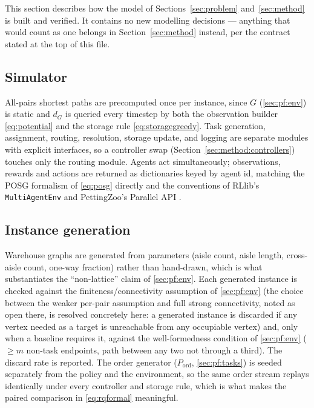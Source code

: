 \documentclass[../main.tex]{subfiles}
\begin{document}
This section describes how the model of Sections~\ref{sec:problem}
and~\ref{sec:method} is built and verified. It contains no new modelling
decisions --- anything that would count as one belongs in
Section~\ref{sec:method} instead, per the contract stated at the top of this
file.

\subsection{Simulator}
\label{sec:impl:simulator}

All-pairs shortest paths are precomputed once per instance, since $G$
(\ref{sec:pf:env}) is static and $d_G$ is queried every timestep by both the
observation builder \eqref{eq:potential} and the storage rule
\eqref{eq:storagegreedy}. Task generation, assignment, routing, resolution,
storage update, and logging are separate modules with explicit interfaces, so
a controller swap (Section~\ref{sec:method:controllers}) touches only the
routing module. Agents act simultaneously; observations, rewards and actions
are returned as dictionaries keyed by agent id, matching the POSG formalism
of \eqref{eq:posg} directly and the conventions of RLlib's
\texttt{MultiAgentEnv} and PettingZoo's Parallel API
\citep{rllibmultiagent,pettingzooparallel}.

\subsection{Instance generation}
\label{sec:impl:instances}

Warehouse graphs are generated from parameters (aisle count, aisle length,
cross-aisle count, one-way fraction) rather than hand-drawn, which is what
substantiates the ``non-lattice'' claim of \ref{sec:pf:env}. Each generated
instance is checked against the finiteness/connectivity assumption of
\ref{sec:pf:env} (the choice between the weaker per-pair assumption and full
strong connectivity, noted as open there, is resolved concretely here: a
generated instance is discarded if any vertex needed as a target is
unreachable from any occupiable vertex) and, only when a baseline requires
it, against the well-formedness condition of \ref{sec:pf:env} ($\ge m$
non-task endpoints, path between any two not through a third). The discard
rate is reported. The order generator ($P_{\mathrm{ord}}$,
\ref{sec:pf:tasks}) is seeded separately from the policy and the environment,
so the same order stream replays identically under every controller and
storage rule, which is what makes the paired comparison in
\eqref{eq:rqformal} meaningful.
\end{document}
